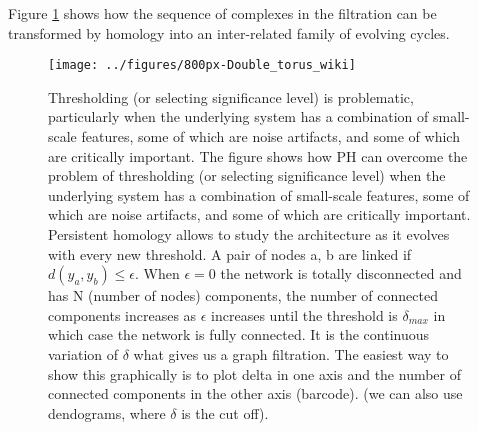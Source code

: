 \documentclass[onecollarge,runningheads]{svjour2}
\begin{document}
Figure \ref{fig:ph} shows how the sequence of complexes in the filtration can be transformed by homology into an inter-related family of evolving cycles.

\begin{figure}[h]
        \centering
        \texttt{[image: ../figures/800px-Double\_torus\_wiki]}
        \caption{
Thresholding (or selecting significance level) is problematic, particularly when the underlying system has a combination of small-scale features, some of which are noise artifacts, and some of which are critically important. The figure shows how PH can overcome the problem of thresholding (or selecting significance level) when the underlying system has a combination of small-scale features, some of which are noise artifacts, and some of which are critically important. Persistent homology allows to study the architecture as it evolves with every new threshold. A pair of nodes a, b are linked if $d(y_a, y_b) \leq \epsilon$. When $\epsilon = 0$ the network is totally disconnected and has N (number of nodes) components, the number of connected components increases as $\epsilon$ increases until the threshold is $\delta_{max}$ in which case the network is fully connected. It is the continuous variation of $\delta$ what gives us a graph filtration. The easiest way to show this graphically is to plot delta in one axis and the number of connected components in the other axis (barcode). (we can also use dendograms, where $\delta$ is the cut off). 
}
\label{fig:ph}
\end{figure}
\end{document}

